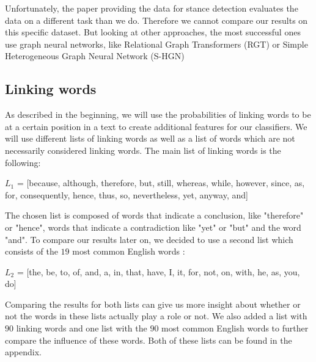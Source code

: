 Unfortunately, the paper providing the data for stance detection \cite{ibm} evaluates the data on a different task than we do. Therefore we cannot compare our results on this specific dataset. But looking at other approaches, the most successful ones use graph neural networks, like Relational Graph Transformers (RGT) \cite{rgt} or Simple Heterogeneous Graph Neural Network (S-HGN) \cite{shgn}

\subsection{Linking words}
As described in the beginning, we will use the probabilities of linking words to be at a certain position in a text to create additional features for our classifiers. We will use different lists of linking words as well as a list of words which are not necessarily considered linking words. The main list of linking words is the following:

\begin{center}
	$L_1$ = [because, although, therefore, but, still, whereas, while, however, since, as, for, consequently, hence, thus, so, nevertheless, yet, anyway, and]
\end{center}

The chosen list is composed of words that indicate a conclusion, like "therefore" or "hence", words that indicate a contradiction like "yet" or "but" and the word "and". To compare our results later on, we decided to use a second list which consists of the $19$ most common English words \cite{mostcommon}:
\begin{center}
	$L_2$ = [the, be, to, of, and, a, in, that, have, I, it, for, not, on, with, he, as, you, do]
\end{center}
Comparing the results for both lists can give us more insight about whether or not the words in these lists actually play a role or not. We also added a list with $90$ linking words and one list with the $90$ most common English words to further compare the influence of these words. Both of these lists can be found in the appendix.

